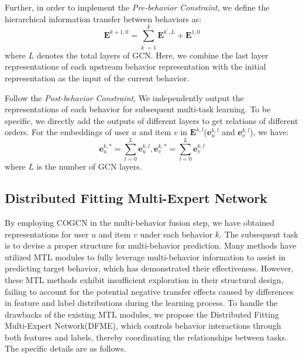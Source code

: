 Further, in order to implement the \textit{Pre-behavior Constraint}, we define the hierarchical information transfer between behaviors as:
\begin{equation}
\mathbf{E}^{k+1,0}=\sum_{k^{\prime}=1}^{k}\mathbf{E}^{k^{\prime},L}+\mathbf{E}^{1,0}
\end{equation}
where $L$ denotes the total layers of GCN. Here, we combine the last layer representations of each upstream behavior representation with the initial representation as the input of the current behavior.

Follow the \textit{Post-behavior Constraint}, We independently output the representations of each behavior for subsequent multi-task learning. To be specific, we directly add the outputs of different layers to get relations of different orders. For the embeddings of user $u$ and item $v$ in 
$\mathbf{E}^{k,l}$($\mathbf{e}_u^{k,l}$ and $\mathbf{e}_v^{k,l}$), we have:
\begin{equation}
\mathbf{e}_u^{k,*} = \sum_{l=0}^{L}\mathbf{e}_u^{k,l}, \mathbf{e}_v^{k,*} = \sum_{l=0}^{L}\mathbf{e}_v^{k,l}
\end{equation}
where $L$ is the number of GCN layers. 
\subsection{Distributed Fitting Multi-Expert Network}
By employing COGCN in the multi-behavior fusion step, we have obtained representations for user $u$ and item $v$ under each behavior $k$. The subsequent task is to devise a proper structure for multi-behavior prediction. Many methods \cite{pkef,cigf,crgcn} have utilized MTL modules to fully leverage multi-behavior information to assist in predicting target behavior, which has demonstrated their effectiveness. However, these MTL methods exhibit insufficient exploration in their structural design, failing to account for the potential negative transfer effects caused by differences in feature and label distributions during the learning process. To handle the drawbacks of the existing MTL modules, we propose the Distributed Fitting Multi-Expert Network(DFME), which controls behavior interactions through both features and labels, thereby coordinating the relationships between tasks. The specific details are as follows.

